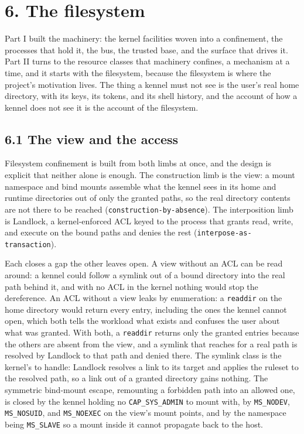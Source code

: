 \hypertarget{the-filesystem}{%
\chapter{6. The filesystem}\label{the-filesystem}}

Part I built the machinery: the kernel facilities woven into a
confinement, the processes that hold it, the bus, the trusted base, and
the surface that drives it. Part II turns to the resource classes that
machinery confines, a mechanism at a time, and it starts with the
filesystem, because the filesystem is where the project's motivation
lives. The thing a kennel must not see is the user's real home
directory, with its keys, its tokens, and its shell history, and the
account of how a kennel does not see it is the account of the
filesystem.

\hypertarget{the-view-and-the-access}{%
\section{6.1 The view and the access}\label{the-view-and-the-access}}

Filesystem confinement is built from both limbs at once, and the design
is explicit that neither alone is enough. The construction limb is the
view: a mount namespace and bind mounts assemble what the kennel sees in
its home and runtime directories out of only the granted paths, so the
real directory contents are not there to be reached
(\texttt{construction-by-absence}). The interposition limb is Landlock,
a kernel-enforced ACL keyed to the process that grants read, write, and
execute on the bound paths and denies the rest
(\texttt{interpose-as-transaction}).

Each closes a gap the other leaves open. A view without an ACL can be
read around: a kennel could follow a symlink out of a bound directory
into the real path behind it, and with no ACL in the kernel nothing
would stop the dereference. An ACL without a view leaks by enumeration:
a \texttt{readdir} on the home directory would return every entry,
including the ones the kennel cannot open, which both tells the workload
what exists and confuses the user about what was granted. With both, a
\texttt{readdir} returns only the granted entries because the others are
absent from the view, and a symlink that reaches for a real path is
resolved by Landlock to that path and denied there. The symlink class is
the kernel's to handle: Landlock resolves a link to its target and
applies the ruleset to the resolved path, so a link out of a granted
directory gains nothing. The symmetric bind-mount escape, remounting a
forbidden path into an allowed one, is closed by the kennel holding no
\texttt{CAP\_SYS\_ADMIN} to mount with, by \texttt{MS\_NODEV},
\texttt{MS\_NOSUID}, and \texttt{MS\_NOEXEC} on the view's mount points,
and by the namespace being \texttt{MS\_SLAVE} so a mount inside it
cannot propagate back to the host.

